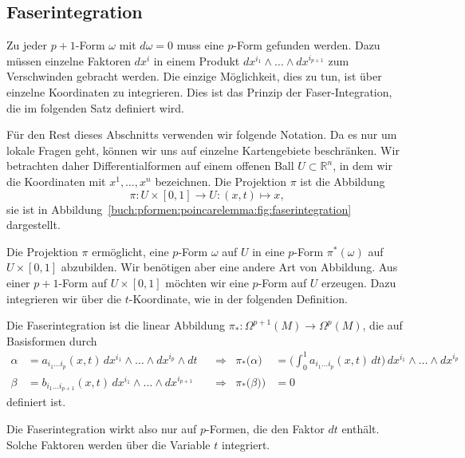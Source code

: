 %
%
\subsection{Faserintegration
\label{buch:pformen:poincare:subsection:faserintegration}}
%
Zu jeder $p+1$-Form $\omega$ mit $d\omega=0$ muss eine $p$-Form gefunden
werden.
Dazu müssen einzelne Faktoren $dx^i$ in einem Produkt
$dx^{i_1}\wedge\dots\wedge dx^{i_{p+1}}$ zum Verschwinden gebracht
werden.
Die einzige Möglichkeit, dies zu tun, ist über einzelne Koordinaten zu
integrieren.
Dies ist das Prinzip der Faser-Integration, die im folgenden Satz
definiert wird.

Für den Rest dieses Abschnitts verwenden wir folgende Notation.
Da es nur um lokale Fragen geht, können wir uns auf einzelne
Kartengebiete beschränken.
Wir betrachten daher Differentialformen auf einem offenen Ball
$U\subset\mathbb{R}^n$, in dem wir die Koordinaten mit $x^1,\dots,x^n$
bezeichnen.
Die Projektion $\pi$ ist die Abbildung
\[
\pi
\colon U \times [0,1]\to U : (x,t) \mapsto x,
\]
sie ist in Abbildung~\ref{buch:pformen:poincarelemma:fig:faserintegration}
dargestellt.

Die Projektion $\pi$ ermöglicht, eine $p$-Form $\omega$ auf $U$ in eine
$p$-Form $\pi^*(\omega)$ auf $U\times [0,1]$ abzubilden.
Wir benötigen aber eine andere Art von Abbildung.
Aus einer $p+1$-Form auf $U\times[0,1]$ möchten wir eine $p$-Form auf
$U$ erzeugen.
Dazu integrieren wir über die $t$-Koordinate, wie in der folgenden
Definition.

\begin{definition}
Die Faserintegration ist die linear Abbildung
$\pi_*\colon \Omega^{p+1}(M)\to\Omega^p(M)$, die auf Basisformen durch
\begin{align*}
\alpha
&=
a_{i_1 \dots i_p}(x,t)
\,
dx^{i_1}\wedge\dots\wedge dx^{i_p}\wedge dt
&&\Rightarrow&
\pi_*\bigl(
\alpha
\bigr)
&=
\biggl(
\int_0^1 a_{i_1 \dots i_p}(x,t)\,dt
\biggr)
\,
dx^{i_1}\wedge\dots\wedge dx^{i_p}
\\
\beta
&=
b_{i_1 \dots i_{p+1}}(x,t)
\,
dx^{i_1}\wedge \dots \wedge dx^{i_{p+1}}
&&\Rightarrow&
\pi_*\bigl(\beta)
\bigr)
&=
0
\end{align*}
definiert ist.
\end{definition}

Die Faserintegration wirkt also nur auf $p$-Formen, die den Faktor $dt$
enthält.
Solche Faktoren werden über die Variable $t$ integriert.

